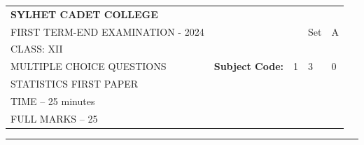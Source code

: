 \documentclass{exam}
\begin{document}
\begin{table}[h]
\centering
\begin{tabular}{lllll}
\textbf{\large SYLHET CADET COLLEGE} &  &  &  &  \\ \cline{4-5} 
FIRST TERM-END EXAMINATION - 2024 &  & \multicolumn{1}{l|}{} & \multicolumn{1}{l|}{Set} & \multicolumn{1}{l|}{A} \\ \cline{4-5} 
CLASS: XII &  &  &  &  \\ \cline{3-5} 
MULTIPLE CHOICE QUESTIONS & \multicolumn{1}{l|}{\textbf{Subject Code:}} & \multicolumn{1}{l|}{1} & \multicolumn{1}{l|}{3} & \multicolumn{1}{l|}{0} \\ \cline{3-5} 
STATISTICS FIRST PAPER &  &  &  &  \\
TIME – 25 minutes &  &  &  &  \\
FULL MARKS – 25 &  &  &  & 
\end{tabular}
\end{table}
\hrule
\end{document}
